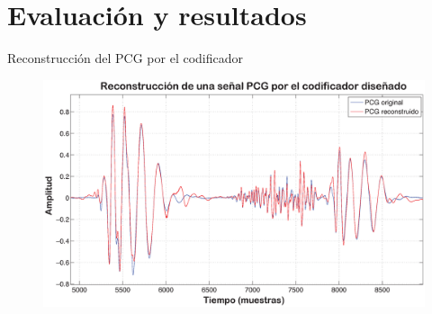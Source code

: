 \documentclass[xcolor=table]{beamer}
\begin{document}
\section{Evaluaci\'on y resultados}
\begin{frame}{Reconstrucci\'on del PCG por el codificador}
	\begin{figure}
		\centering
		\includegraphics[scale=0.3]{pcgRecons.eps}
	\end{figure}
\end{frame}
\end{document}
